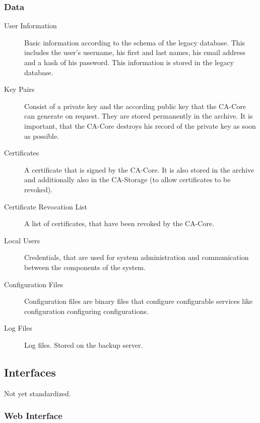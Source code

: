 \documentclass{article}
\begin{document}
\subsubsection{Data}

\begin{description}

\item[User Information] Basic information according to the schema of the legacy database. This includes the user's username, his first and last names, his email address and a hash of his password. This information is stored in the legacy database.

\item[Key Pairs] Consist of a private key and the according public key that the CA-Core can generate on request. They are stored permanently in the archive. It is important, that the CA-Core destroys his record of the private key as soon as possible.

\item[Certificates] A certificate that is signed by the CA-Core. It is also stored in the archive and additionally also in the CA-Storage (to allow certificates to be revoked).

\item[Certificate Revocation List] A list of certificates, that have been revoked by the CA-Core.

\item[Local Users] Credentials, that are used for system administration and communication between the components of the system.

\item[Configuration Files] Configuration files are binary files that configure configurable services like configuration configuring configurations.

\item[Log Files] Log files. Stored on the backup server.

\end{description}

\subsection{Interfaces}

Not yet standardized.

\subsubsection{Web Interface}
\end{document}
